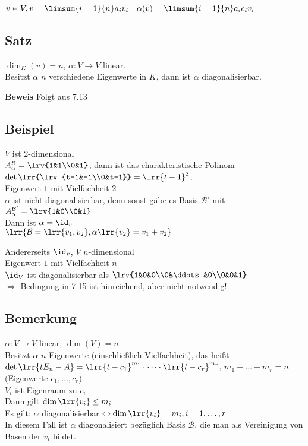 {	$v\in V, v=\limsum{i=1}{n}a_iv_i\quad \alpha(v)=\limsum{i=1}{n}a_ic_iv_i$
	
\subsection{Satz}
	$\dim_K(v)=n$, $\alpha:V\rightarrow V$ linear.\\
	Besitzt $\alpha$ $n$ verschiedene Eigenwerte in $K$, dann ist $\alpha$ diagonalisierbar.
	
	\textbf{Beweis} Folgt aus 7.13
	
\subsection{Beispiel}
	$V$ ist 2-dimensional\\
	$A_\alpha^\mathcal{B}=\lrv{1&1\\0&1}$, dann ist das charakteristische Polinom $\det\lrr{\lrv{t-1&-1\\0&t-1}}=\lrr{t-1}^2$.\\
	Eigenwert $1$ mit Vielfachheit $2$\\
	$\alpha$ ist nicht diagonalisierbar, denn sonst gäbe es Basis $\mathcal{B}'$ mit $A_\alpha^{\mathcal{B}'}=\lrv{1&0\\0&1}$\\
	Dann ist $\alpha=\id_v$\lightning\\
	$\lrr{\mathcal{B}=\lrr{v_1,v_2},\alpha\lrr{v_2}=v_1+v_2}$
	
	Andererseits $\id_v$, $V$ $n$-dimensional\\
	Eigenwert $1$ mit Vielfachheit $n$\\
	$\id_V$ ist diagonalisierbar als $\lrv{1&0&0\\0&\ddots&0\\0&0&1}$\\
	$\Rightarrow$ Bedingung in 7.15 ist hinreichend, aber nicht notwendig!
	
\subsection{Bemerkung}
	$\alpha:V\rightarrow V$ linear, $\dim(V)=n$\\
	Besitzt $\alpha$ $n$ Eigenwerte (einschließlich Vielfachheit), das heißt $\det\lrr{tE_n-A}=\lrr{t-c_1}^{m_1}\cdot\dots\cdot\lrr{t-c_r}^{m_r}$, $m_1+\dots+m_r=n$ (Eigenwerte $c_1,\dots,c_r$)\\
	$V_i$ ist Eigenraum zu $c_i$\\
	Dann gilt $\dim\lrr{v_i}\leq m_i$\\
	Es gilt: $\alpha$ diagonalisierbar $\Leftrightarrow\dim\lrr{v_i}=m_i, i=1,\dots, r$\\
	In diesem Fall ist $\alpha$ diagonalisiert bezüglich Basis $\mathcal{B}$, die man als Vereinigung von Basen der $v_i$ bildet.
	
}
